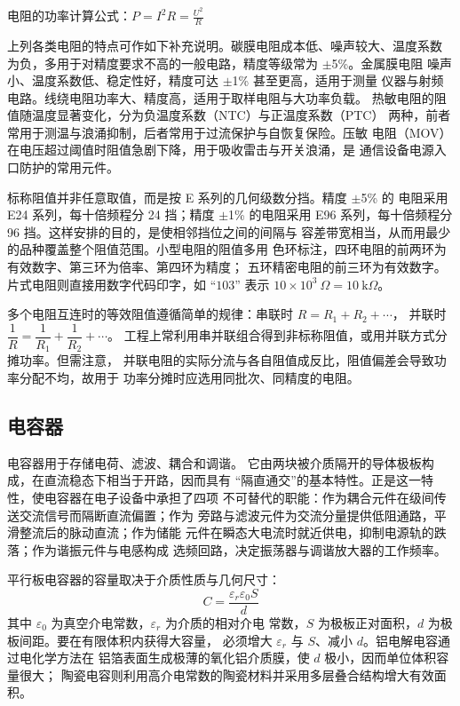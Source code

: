 电阻的功率计算公式：$P = I^2R = \frac{U^2}{R}$

上列各类电阻的特点可作如下补充说明。碳膜电阻成本低、噪声较大、温度系数
为负，多用于对精度要求不高的一般电路，精度等级常为 $\pm$5\%。金属膜电阻
噪声小、温度系数低、稳定性好，精度可达 $\pm$1\% 甚至更高，适用于测量
仪器与射频电路。线绕电阻功率大、精度高，适用于取样电阻与大功率负载。
热敏电阻的阻值随温度显著变化，分为负温度系数（NTC）与正温度系数（PTC）
两种，前者常用于测温与浪涌抑制，后者常用于过流保护与自恢复保险。压敏
电阻（MOV）在电压超过阈值时阻值急剧下降，用于吸收雷击与开关浪涌，是
通信设备电源入口防护的常用元件。

标称阻值并非任意取值，而是按 E 系列的几何级数分挡。精度 $\pm$5\% 的
电阻采用 E24 系列，每十倍频程分 24 挡；精度 $\pm$1\% 的电阻采用 E96
系列，每十倍频程分 96 挡。这样安排的目的，是使相邻挡位之间的间隔与
容差带宽相当，从而用最少的品种覆盖整个阻值范围。小型电阻的阻值多用
色环标注，四环电阻的前两环为有效数字、第三环为倍率、第四环为精度；
五环精密电阻的前三环为有效数字。片式电阻则直接用数字代码印字，如
“$103$” 表示 $10\times10^3\ \Omega = 10\ \mathrm{k}\Omega$。

多个电阻互连时的等效阻值遵循简单的规律：串联时 $R = R_1 + R_2 + \cdots$，
并联时 $\dfrac{1}{R} = \dfrac{1}{R_1} + \dfrac{1}{R_2} + \cdots$。
工程上常利用串并联组合得到非标称阻值，或用并联方式分摊功率。但需注意，
并联电阻的实际分流与各自阻值成反比，阻值偏差会导致功率分配不均，故用于
功率分摊时应选用同批次、同精度的电阻。

\subsection{电容器}

电容器用于存储电荷、滤波、耦合和调谐。
它由两块被介质隔开的导体极板构成，在直流稳态下相当于开路，因而具有
“隔直通交”的基本特性。正是这一特性，使电容器在电子设备中承担了四项
不可替代的职能：作为耦合元件在级间传送交流信号而隔断直流偏置；作为
旁路与滤波元件为交流分量提供低阻通路，平滑整流后的脉动直流；作为储能
元件在瞬态大电流时就近供电，抑制电源轨的跌落；作为谐振元件与电感构成
选频回路，决定振荡器与调谐放大器的工作频率。

平行板电容器的容量取决于介质性质与几何尺寸：
\[
C = \frac{\varepsilon_r \varepsilon_0 S}{d}
\]
其中 $\varepsilon_0$ 为真空介电常数，$\varepsilon_r$ 为介质的相对介电
常数，$S$ 为极板正对面积，$d$ 为极板间距。要在有限体积内获得大容量，
必须增大 $\varepsilon_r$ 与 $S$、减小 $d$。铝电解电容通过电化学方法在
铝箔表面生成极薄的氧化铝介质膜，使 $d$ 极小，因而单位体积容量很大；
陶瓷电容则利用高介电常数的陶瓷材料并采用多层叠合结构增大有效面积。

